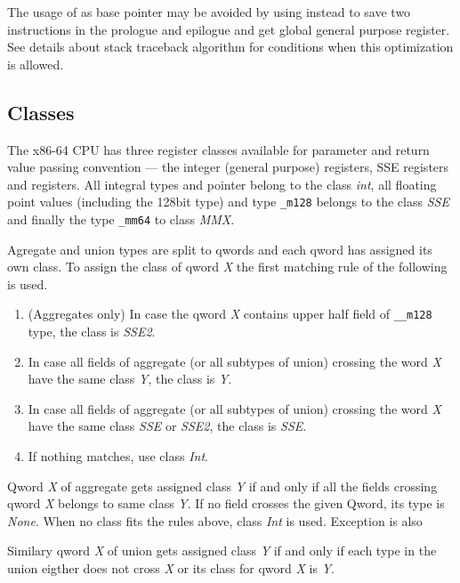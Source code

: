 The usage of \RBP{} as base pointer may be avoided by using \RSP{} instead
to save two instructions in the prologue and epilogue and get global general
purpose register.  See details about stack traceback algorithm for conditions
when this optimization is allowed.

\subsection{Classes}

The x86-64 CPU has three register classes available for parameter and
return value passing convention --- the integer (general purpose)
registers, SSE registers and \MMX registers.  All integral types and
pointer belong to the class \emph{int}, all floating point values
(including the 128bit type) and type \verb|_m128| belongs to the class
\emph{SSE} and finally the type \verb|_mm64| to class \emph{MMX}.

Agregate and union types are split to qwords and each qword has
assigned its own class. To assign the class of qword \emph{X} the
first matching rule of the following is used.
\begin{enumerate}
\item (Aggregates only) In case the qword \emph{X} contains upper half field of
\verb|__m128| type, the class is \emph{SSE2}.

\item In case all fields of aggregate (or all subtypes of union) crossing the
word \emph{X} have the same class \emph{Y}, the class is \emph{Y}.

\item In case all fields of aggregate (or all subtypes of union) crossing the
word \emph{X} have the same class \emph{SSE} or \emph{SSE2}, the class
is \emph{SSE}.

\item If nothing matches, use class \emph{Int}.
\end{enumerate}

Qword \emph{X} of aggregate gets assigned class \emph{Y} if and only
if all the fields crossing qword \emph{X} belongs to same class \emph{Y}.  If
no field crosses the given Qword, its type is \emph{None}. When no class fits
the rules above, class \emph{Int} is used.  Exception is also 

Similary qword \emph{X} of union gets assigned class \emph{Y} if and only if
each type in the union eigther does not cross \emph{X} or its class for qword
\emph{X} is \emph{Y}.


